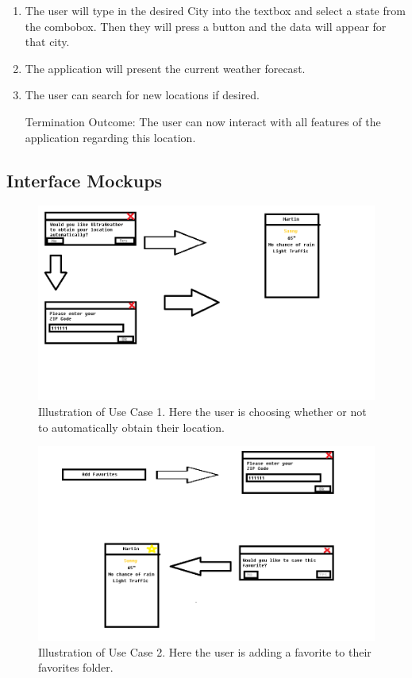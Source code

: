 \documentclass[10pt,conference,onecolumn,compsoc]{IEEEtran}
\begin{document}
\begin{enumerate}
\item The user will type in the desired City into the textbox and select a state from the combobox. Then they will press a button and the data will appear for that city.
\item The application will present the current weather forecast.
\item The user can search for new locations if desired. 
\item[Termination Outcome:] The user can now interact with all features of the application regarding this location.
\end{enumerate}

\subsection{Interface Mockups}
\begin{figure}[ht!]
\includegraphics[scale=0.3]{use_case_1.png}
\caption{Illustration of Use Case 1. Here the user is choosing whether or not to automatically obtain their location.}
\label{use_case_1}
\end{figure}

\begin{figure}[ht!]
\includegraphics[scale=0.3]{use_case_2.png}
\caption{Illustration of Use Case 2. Here the user is adding a favorite to their favorites folder.}
\label{use_case_2}
\end{figure}
\end{document}
